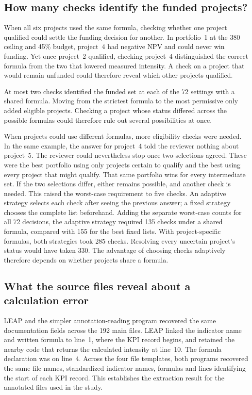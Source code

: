 \subsection{How many checks identify the funded projects?}
When all six projects used the same formula, checking whether one project qualified could settle the funding decision for another. In portfolio~1 at the 380 ceiling and 45\% budget, project~4 had negative NPV and could never win funding. Yet once project~2 qualified, checking project~4 distinguished the correct formula from the two that lowered measured intensity. A check on a project that would remain unfunded could therefore reveal which other projects qualified.

At most two checks identified the funded set at each of the 72 settings with a shared formula. Moving from the strictest formula to the most permissive only added eligible projects. Checking a project whose status differed across the possible formulas could therefore rule out several possibilities at once.

When projects could use different formulas, more eligibility checks were needed. In the same example, the answer for project~4 told the reviewer nothing about project~5. The reviewer could nevertheless stop once two selections agreed. These were the best portfolio using only projects certain to qualify and the best using every project that might qualify. That same portfolio wins for every intermediate set. If the two selections differ, either remains possible, and another check is needed. This raised the worst-case requirement to five checks. An adaptive strategy selects each check after seeing the previous answer; a fixed strategy chooses the complete list beforehand. Adding the separate worst-case counts for all 72 decisions, the adaptive strategy required 135 checks under a shared formula, compared with 155 for the best fixed lists. With project-specific formulas, both strategies took 285 checks. Resolving every uncertain project's status would have taken 330. The advantage of choosing checks adaptively therefore depends on whether projects share a formula.

\subsection{What the source files reveal about a calculation error}
LEAP and the simpler annotation-reading program recovered the same documentation fields across the 192 main files. LEAP linked the indicator name and written formula to line~1, where the KPI record begins, and retained the nearby code that returns the calculated intensity at line~10. The formula declaration was on line~4. Across the four file templates, both programs recovered the same file names, standardized indicator names, formulas and lines identifying the start of each KPI record. This establishes the extraction result for the annotated files used in the study.

